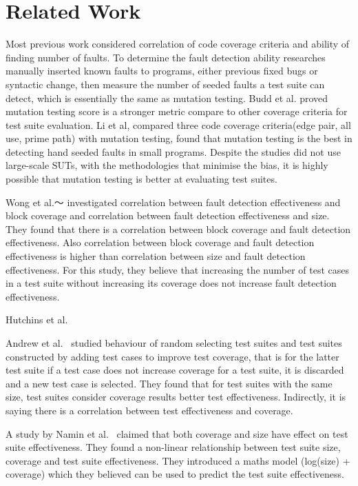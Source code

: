 \section{Related Work}
\label{sec:related}
Most previous work considered correlation of code coverage criteria and ability of finding number of faults. To determine the fault detection ability researches manually inserted known faults to programs, either previous fixed bugs or syntactic change, then measure the number of seeded faults a test suite can detect, which is essentially the same as mutation testing. Budd et al. proved mutation testing score is a stronger metric compare to other coverage criteria for test suite evaluation. Li et al, compared three code coverage criteria(edge pair, all use, prime path) with mutation testing, found that mutation testing is the best in detecting hand seeded faults in small programs. Despite the studies did not use large-scale SUTs, with the methodologies that minimise the bias, it is highly possible that mutation testing is better at evaluating test suites.

Wong et al.～\cite{wong1994effect} investigated correlation between fault detection effectiveness and block coverage and correlation between fault detection effectiveness and size. They found that there is a correlation between block coverage and fault detection effectiveness. Also correlation between block coverage and fault detection effectiveness is higher than correlation between size and fault detection effectiveness. For this study, they believe that increasing the number of test cases in a test suite without increasing its coverage does not increase fault detection effectiveness.

Hutchins et al.~\cite{hutchins1994experiments} 

Andrew et al.~\cite{andrews2006using} studied behaviour of random selecting test suites and test suites constructed by adding test cases to improve test coverage, that is for the latter test suite if a test case does not increase coverage for a test suite, it is discarded and a new test case is selected. They found that for test suites with the same size, test suites consider coverage results better test effectiveness. Indirectly, it is saying there is a correlation between test effectiveness and coverage.

A study by Namin et al.~\cite{namin2009influence} claimed that both coverage and size have effect on test suite effectiveness. They found a non-linear relationship between test suite size, coverage and test suite effectiveness. They introduced a maths model (log(size) + coverage) which they believed can be used to predict the test suite effectiveness.

